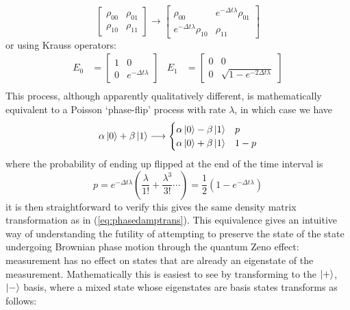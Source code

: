 \documentclass{report}
\begin{document}
\begin{appendices}
\begin{equation}
\begin{bmatrix}
        \rho_{00} & \rho_{01} \\ \rho_{10} & \rho_{11}
    \end{bmatrix}
    \longrightarrow
    \begin{bmatrix}
        \rho_{00} & e^{-\Delta t \lambda} \rho_{01} \\ e^{-\Delta t \lambda} \rho_{10} & \rho_{11}
    \end{bmatrix}
\end{equation} or using Krauss operators:
\begin{align*}
E_0 &= \begin{bmatrix}
1 & 0\\
0 & e^{-\Delta t \lambda}
\end{bmatrix}   &   E_1 &= \begin{bmatrix}
0 & 0\\
0 & \sqrt{1-e^{-2\Delta t \lambda}}
\end{bmatrix}\\
\end{align*}
This process, although apparently qualitatively different, is mathematically equivalent to a Poisson `phase-flip' process with rate $\lambda$, in which case we have
\begin{equation*}
\alpha\ket{0} + \beta\ket{1} \longrightarrow 
\begin{cases} 
      \alpha\ket{0} - \beta\ket{1} & p\\
      \alpha\ket{0} + \beta\ket{1} & 1-p \\
   \end{cases}
\end{equation*} where the probability of ending up flipped at the end of the time interval is
\begin{equation}\label{eq:p_def}
    p = e^{-\Delta t \lambda}\left(\frac{\lambda}{1!} + \frac{\lambda^3}{3!} \cdots\right) = \frac{1}{2}(1-e^{-\Delta t \lambda})
\end{equation}
it is then straightforward to verify this gives the same density matrix transformation as in (\ref{eq:phasedamptrans}). This equivalence gives an intuitive way of understanding the futility of attempting to preserve the state of the state undergoing Brownian phase motion through the quantum Zeno effect: measurement has no effect on states that are already an eigenstate of the measurement. Mathematically this is easiest to see by transforming to the $\ket{+}$, $\ket{-}$ basis, where a mixed state whose eigenstates are basis states transforms as follows:
\begin{align*}

\end{align*}
\end{appendices}
\end{document}
